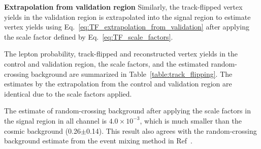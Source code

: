 \textbf{Extrapolation from validation region} Similarly, the track-flipped vertex yields in the validation region is extrapolated into the signal region to estimate vertex yields using Eq.~\ref{eq:TF_extrapolation_from_validation} after applying the scale factor defined by Eq.~\ref{eq:TF_scale_factors}.

The lepton probability, track-flipped and reconstructed vertex yields in the control and validation region, the scale factors, and the estimated random-crossing background are summarized in Table~\ref{table:track_flipping}. The estimates by the extrapolation from the control and validation region are identical due to the scale factors applied.

The estimate of random-crossing background after applying the scale factors in the signal region in all channel is $4.0\times10^{-3}$, which is much smaller than the cosmic background (0.26$\pm$0.14). This result also agrees with the random-crossing background estimate from the event mixing method in Ref~\cite{DuarteCampderros:2275055}.



